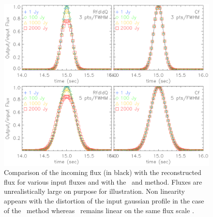 \begin{figure}[h]
\center
\includegraphics[clip, angle=0, width=\columnwidth]{Figures/planet_profiles.eps}
\caption{Comparison of the incoming flux (in black) with the reconstructed flux
  for various input fluxes and with the \rf\ and \cf method. Fluxes are
  unrealistically large on purpose for illustration. Non linearity
  appears with the distortion of the input gaussian profile in the case of the
  \rf\ method whereas \cf\ remains linear on the same flux scale .}
\label{fig:planets}
\end{figure}


